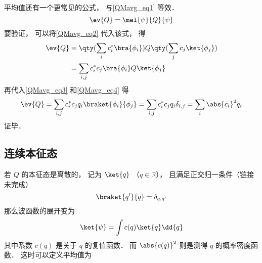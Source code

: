 平均值还有一个更常见的公式， 与\autoref{QMavg_eq1} 等效．
\begin{equation}\label{QMavg_eq5}
\ev{Q} = \mel{\psi}{Q}{\psi}
\end{equation}
要验证， 可以将\autoref{QMavg_eq2} 代入该式， 得
\begin{equation}
\begin{aligned}
\ev{Q} &= \qty(\sum_i c_i^* \bra{\phi_i}) Q \qty(\sum_j c_j \ket{\phi_j})\\
&= \sum_{i,j} c_i^* c_j \bra{\phi_i} Q \ket{\phi_j}
\end{aligned} 
\end{equation}
再代入\autoref{QMavg_eq3} 和\autoref{QMavg_eq4} 得
\begin{equation}
\ev{Q} = \sum_{i,j} c_i^* c_j q_i \braket{\phi_i}{\phi_j}
= \sum_{i,j} c_i^* c_j q_i \delta_{i,j} = \sum_i \abs{c_i}^2 q_i
\end{equation}
证毕．

\subsection{连续本征态}
若 $Q$ 的本征态是离散的， 记为 $\ket{q}$ （$q\in \mathbb R$）， 且满足正交归一条件（链接未完成）
\begin{equation}
\braket{q'}{q} = \delta_{q,q'}
\end{equation}
那么波函数的展开变为
\begin{equation}
\ket{\psi} = \int c(q) \ket{q} \dd{q}
\end{equation}
其中系数 $c(q)$ 是关于 $q$ 的复值函数． 而 $\abs{c(q)}^2$ 则是测得 $q$ 的概率密度函数． 这时可以定义平均值为
\begin{equation}

\end{equation}



